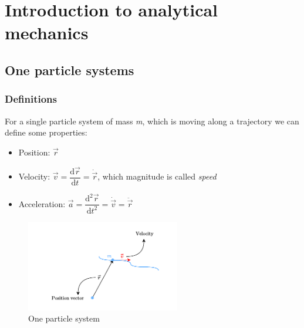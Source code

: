 \chapter{Introduction to analytical mechanics}
\section{One particle systems}
\subsection{Definitions}
For a single particle system of mass \textit{m}, which is moving along a trajectory we can define some properties:
\begin{itemize}
    \item Position: $\vec{r}$
    \item Velocity: $\vec{v} = \dfrac{\mathrm{d} \vec{r}}{\mathrm{d} t}=\dot{\vec{r}}$, which magnitude is called \textit{speed}
    \item Acceleration: $\vec{a}=\dfrac{\mathrm{d}^2 \vec{r}}{\mathrm{d} t^2}=\dot{\vec{v}}=\ddot{\vec{r}}$
\end{itemize}
\begin{figure}[H]
    \centering
    \includegraphics[width=0.6\textwidth]{res/svg/onepartsys.drawio}
    \caption{One particle system}
    \label{fig:image1}
\end{figure}

